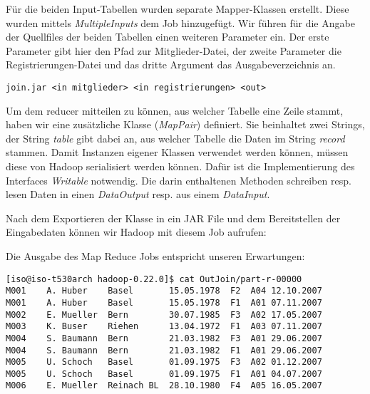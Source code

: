 \documentclass[11pt,a4paper,parskip=half]{scrartcl}
\begin{document}
Für die beiden Input-Tabellen wurden separate Mapper-Klassen erstellt. Diese wurden mittels \emph{MultipleInputs} dem Job hinzugefügt. Wir führen für die Angabe der Quellfiles der beiden Tabellen einen weiteren Parameter ein. Der erste Parameter gibt hier den Pfad zur Mitglieder-Datei, der zweite Parameter die Registrierungen-Datei und das dritte Argument das Ausgabeverzeichnis an.
\begin{lstlisting}
join.jar <in mitglieder> <in registrierungen> <out>
\end{lstlisting}
Um dem reducer mitteilen zu können, aus welcher Tabelle eine Zeile stammt, haben wir eine zusätzliche Klasse (\emph{MapPair}) definiert. Sie beinhaltet zwei Strings, der String \emph{table} gibt dabei an, aus welcher Tabelle die Daten im String \emph{record} stammen. Damit Instanzen eigener Klassen verwendet werden können, müssen diese von Hadoop serialisiert werden können. Dafür ist die Implementierung des Interfaces \emph{Writable} notwendig. Die darin enthaltenen Methoden schreiben resp. lesen Daten in einen \emph{DataOutput} resp. aus einem \emph{DataInput}.



Nach dem Exportieren der Klasse in ein JAR File und dem Bereitstellen der Eingabedaten können wir Hadoop mit diesem Job aufrufen:



Die Ausgabe des Map Reduce Jobs entspricht unseren Erwartungen:
\begin{lstlisting}
[iso@iso-t530arch hadoop-0.22.0]$ cat OutJoin/part-r-00000 
M001	A. Huber	Basel		15.05.1978	F2	A04	12.10.2007
M001	A. Huber	Basel		15.05.1978	F1	A01	07.11.2007
M002	E. Mueller	Bern		30.07.1985	F3	A02	17.05.2007
M003	K. Buser	Riehen		13.04.1972	F1	A03	07.11.2007
M004	S. Baumann	Bern		21.03.1982	F3	A01	29.06.2007
M004	S. Baumann	Bern		21.03.1982	F1	A01	29.06.2007
M005	U. Schoch	Basel		01.09.1975	F3	A02	01.12.2007
M005	U. Schoch	Basel		01.09.1975	F1	A01	04.07.2007
M006	E. Mueller	Reinach BL	28.10.1980	F4	A05	16.05.2007
\end{lstlisting}
\end{document}
